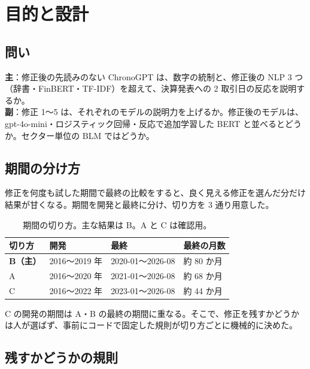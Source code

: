 \documentclass[xelatex,ja=standard,jafont=haranoaji,a4paper,10pt,openany]{bxjsreport}
\begin{document}
\setcounter{tocdepth}{1}
{\small\tableofcontents}

\chapter{目的と設計}\label{ch:design}

\section{問い}

\begin{verdict}[問い]
\textbf{主}：修正後の先読みのない ChronoGPT は、数字の統制と、修正後の NLP 3 つ（辞書・FinBERT・TF-IDF）を超えて、決算発表への 2 取引日の反応を説明するか。\\
\textbf{副}：修正 1〜5 は、それぞれのモデルの説明力を上げるか。修正後のモデルは、gpt-4o-mini・ロジスティック回帰・反応で追加学習した BERT と並べるとどうか。セクター単位の BLM ではどうか。
\end{verdict}

\section{期間の分け方}

修正を何度も試した期間で最終の比較をすると、良く見える修正を選んだ分だけ結果が甘くなる。期間を開発と最終に分け、切り方を 3 通り用意した。

\begin{table}[H]
\centering
\caption{期間の切り方。主な結果は B。A と C は確認用。}
\small
\begin{tabular}{llll}
\toprule
切り方 & 開発 & 最終 & 最終の月数 \\
\midrule
\textbf{B（主）} & 2016〜2019 年 & 2020-01〜2026-08 & 約 80 か月 \\
A & 2016〜2020 年 & 2021-01〜2026-08 & 約 68 か月 \\
C & 2016〜2022 年 & 2023-01〜2026-08 & 約 44 か月 \\
\bottomrule
\end{tabular}
\end{table}

C の開発の期間は A・B の最終の期間に重なる。そこで、修正を残すかどうかは人が選ばず、事前にコードで固定した規則が切り方ごとに機械的に決めた。

\section{残すかどうかの規則}
\end{document}
